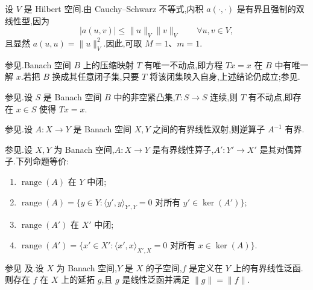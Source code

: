 \begin{note}[内积作为双线性型]\label{note:appendix-a-67}
设 $V$ 是 Hilbert 空间.由 Cauchy--Schwarz 不等式,内积 $a(\cdot,\cdot)$ 是有界且强制的双线性型,因为
\[
 |a(u,v)|\le\|u\|_V\|v\|_V\qquad\forall u,v\in V,
\]
且显然 $a(u,u)=\|u\|_V^2$.因此,可取 $M=1$、$m=1$.
\end{note}

\begin{theorem}\label{thm:appendix-a-68}
参见\textcite[定理 5.1]{GilbargTrudinger1983}.Banach 空间 $B$ 上的压缩映射 $T$ 有唯一不动点,即方程 $Tx=x$ 在 $B$ 中有唯一解 $x$.若把 $B$ 换成其任意闭子集,只要 $T$ 将该闭集映入自身,上述结论仍成立;参见\textcite[第 74 页]{GilbargTrudinger1983}.
\end{theorem}

\begin{theorem}\label{thm:appendix-a-69}
参见\textcite[定理 11.1]{GilbargTrudinger1983}.设 $S$ 是 Banach 空间 $B$ 中的非空紧凸集,$T:S\to S$ 连续,则 $T$ 有不动点,即存在 $x\in S$ 使得 $Tx=x$.
\end{theorem}

\begin{theorem}\label{thm:appendix-a-70}
参见\textcite[第 225 页]{KolmogorovFomin1975}.设 $A:X\to Y$ 是 Banach 空间 $X,Y$ 之间的有界线性双射,则逆算子 $A^{-1}$ 有界.
\end{theorem}

\begin{theorem}\label{thm:appendix-a-71}
参见\textcite[第 205 页]{Yosida1995}.设 $X,Y$ 为 Banach 空间,$A:X\to Y$ 是有界线性算子,$A':Y'\to X'$ 是其对偶算子.下列命题等价:
\begin{enumerate}[label=(\roman*)]
 \item $\operatorname{range}(A)$ 在 $Y$ 中闭;
 \item $\operatorname{range}(A)=\{y\in Y:\langle y',y\rangle_{Y',Y}=0\text{ 对所有 }y'\in\ker(A')\}$;
 \item $\operatorname{range}(A')$ 在 $X'$ 中闭;
 \item $\operatorname{range}(A')=\{x'\in X':\langle x',x\rangle_{X',X}=0\text{ 对所有 }x\in\ker(A)\}$.
\end{enumerate}
\end{theorem}

\begin{theorem}\label{thm:appendix-a-72}
参见\textcite[第 IV.1 节]{Yosida1995} 及\textcite[第 67 页]{Triebel1972}.设 $X$ 为 Banach 空间,$Y$ 是 $X$ 的子空间,$f$ 是定义在 $Y$ 上的有界线性泛函.则存在 $f$ 在 $X$ 上的延拓 $g$,且 $g$ 是线性泛函并满足 $\|g\|=\|f\|$.
\end{theorem}
